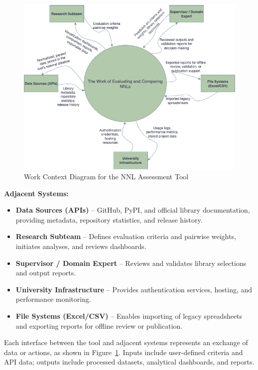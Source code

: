 \documentclass[12pt]{article}
\begin{document}
\begin{figure}[H]
    \centering
    \includegraphics[width=\textwidth]{context-diagram.png}
    \caption{Work Context Diagram for the NNL Assessment Tool}
    \label{fig:context-diagram}
\end{figure}

\noindent
\textbf{Adjacent Systems:}
\begin{itemize}
    \item \textbf{Data Sources (APIs)} – GitHub, PyPI, and official library documentation, providing metadata, repository statistics, and release history.
    \item \textbf{Research Subteam} – Defines evaluation criteria and pairwise weights, initiates analyses, and reviews dashboards.
    \item \textbf{Supervisor / Domain Expert} – Reviews and validates library selections and output reports.
    \item \textbf{University Infrastructure} – Provides authentication services, hosting, and performance monitoring.
    \item \textbf{File Systems (Excel/CSV)} – Enables importing of legacy spreadsheets and exporting reports for offline review or publication.
\end{itemize}

\noindent
Each interface between the tool and adjacent systems represents an exchange of data or actions, as shown in Figure~\ref{fig:context-diagram}. Inputs include user-defined criteria and API data; outputs include processed datasets, analytical dashboards, and reports.
\end{document}
